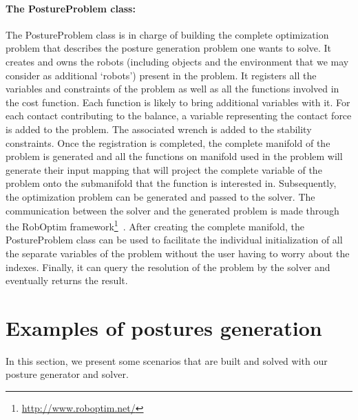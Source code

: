 \paragraph{The PostureProblem class:}
The PostureProblem class is in charge of building the complete optimization problem that describes the posture generation problem one wants to solve.
It creates and owns the robots (including objects and the environment that we may consider as additional `robots') present in the problem.
It registers all the variables and constraints of the problem as well as all the functions involved in the cost function.
Each function is likely to bring additional variables with it.
For each contact contributing to the balance, a variable representing the contact force is added to the problem.
The associated wrench is added to the stability constraints.
Once the registration is completed, the complete manifold of the problem is generated and all the functions on manifold used in the problem will generate their input mapping that will project the complete variable of the problem onto the submanifold that the function is interested in.
Subsequently, the optimization problem can be generated and passed to the solver.
The communication between the solver and the generated problem is made through the RobOptim framework\footnote{\url{http://www.roboptim.net/}}~\cite{moulard:jsme:2013, moulard:jrsj:2014}.
After creating the complete manifold, the PostureProblem class can be used to facilitate the individual initialization of all the separate variables of the problem without the user having to worry about the indexes. Finally, it can query the resolution of the problem by the solver and eventually returns the result.

\section{Examples of postures generation}
\label{sec:examples_of_postures_generation}

In this section, we present some scenarios that are built and solved with our posture generator and solver.
